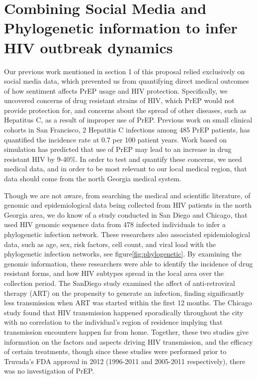 \section{Combining Social Media and Phylogenetic information to infer HIV outbreak dynamics}

Our previous work mentioned in section 1 of this proposal relied exclusively on social media data, which prevented us from quantifying direct medical outcomes of how sentiment affects PrEP usage and HIV protection. Specifically, we uncovered concerns of drug resistant strains of HIV, which PrEP would not provide protection for, and concerns about the spread of other diseases, such as Hepatitus C, as a result of improper use of PrEP. Previous work on small clinical cohorts in San Francisco, 2 Hepatitis C infections among 485 PrEP patients, has quantified the incidence rate at 0.7 per 100 patient years\cite{volk2015incident}. Work based on simulation has predicted that use of PrEP may lead to an increase in drug resistant HIV by 9-40\%\cite{abbas2011factors}. In order to test and quantify these concerns, we need medical data, and in order to be most relevant to our local medical region, that data should come from the north Georgia medical system.

Though we are not aware, from searching the medical and scientific literature, of genomic and epidemiological data being collected from HIV patients in the north Georgia area, we do know of a study conducted in San Diego\cite{little2014using} and Chicago\cite{morgan2017hiv}, that used HIV genomic sequence data from 478 infected individuals to infer a phylogenetic infection network. These researchers also associated epidemiological data, such as age, sex, risk factors, cell count, and viral load with the phylogenetic infection networks, see figure\ref{fig:phylogenetic}. By examining the genomic information, these researchers were able to identify the incidence of drug resistant forms, and how HIV subtypes spread in the local area over the collection period. The SanDiego study examined the affect of anti-retroviral therapy (ART) on the propensity to generate an infection, finding significantly less transmission when ART was started within the first 12 months. The Chicago study found that HIV transmission happened sporadically throughout the city with no correlation to the individual's region of residence implying that transmission encounters happen far from home. Together, these two studies give information on the factors and aspects driving HIV transmission, and the efficacy of certain treatments, though since these studies were performed prior to Truvada's FDA approval in 2012 (1996-2011 and 2005-2011 respectively), there was no investigation of PrEP.

